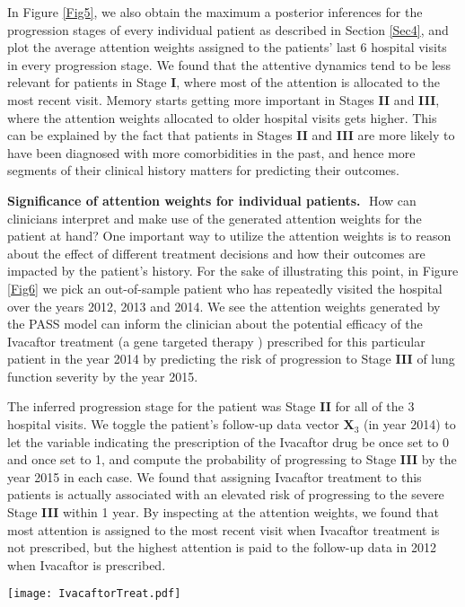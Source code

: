 \documentclass[twoside,11pt]{article}
\begin{document}
In Figure \ref{Fig5}, we also obtain the maximum a posterior inferences for the progression stages of every individual patient as described in Section \ref{Sec4}, and plot the average attention weights assigned to the patients' last 6 hospital visits in every progression stage. We found that the attentive dynamics tend to be less relevant for patients in Stage {\bf I}, where most of the attention is allocated to the most recent visit. Memory starts getting more important in Stages {\bf II} and {\bf III}, where the attention weights allocated to older hospital visits gets higher. This can be explained by the fact that patients in Stages {\bf II} and {\bf III} are more likely to have been diagnosed with more comorbidities in the past, and hence more segments of their clinical history matters for predicting their outcomes.  
 
{\bf Significance of attention weights for individual patients.}\,\, How can clinicians interpret and make use of the generated attention weights for the patient at hand? One important way to utilize the attention weights is to reason about the effect of different treatment decisions and how their outcomes are impacted by the patient's history. For the sake of illustrating this point, in Figure \ref{Fig6} we pick an out-of-sample patient who has repeatedly visited the hospital over the years 2012, 2013 and 2014. We see the attention weights generated by the PASS model can inform the clinician about the potential efficacy of the Ivacaftor treatment (a gene targeted therapy \cite{wainwright2015lumacaftor}) prescribed for this particular patient in the year 2014 by predicting the risk of progression to Stage {\bf III} of lung function severity by the year 2015.  

\begin{minipage}{0.425\textwidth}
The inferred progression stage for the patient was Stage {\bf II} for all of the 3 hospital visits. We toggle the patient's follow-up data vector \mbox{$\boldsymbol{X}_3$} (in year 2014) to let the variable indicating the prescription of the Ivacaftor drug be once set to 0 and once set to 1, and compute the probability of progressing to Stage {\bf III} by the year 2015 in each case. We found that assigning Ivacaftor treatment to this patients is actually associated with an elevated risk of progressing to the severe Stage {\bf III} within 1 year. By inspecting at the attention weights, we found that most attention is assigned to the most recent visit when Ivacaftor treatment is not prescribed, but the highest attention is paid to the follow-up data in 2012 when Ivacaftor is prescribed.       
\end{minipage}
\hfill
\begin{minipage}[h]{0.55\textwidth}
  \centering
  \texttt{[image: IvacaftorTreat.pdf]}
	\label{Fig6}
\end{minipage} 
\end{document}
